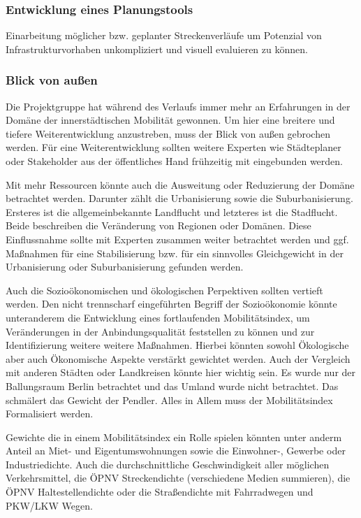 \subsubsection{Entwicklung eines Planungstools}
Einarbeitung möglicher bzw. geplanter Streckenverläufe um Potenzial von Infrastrukturvorhaben unkompliziert und visuell evaluieren zu können.

\subsubsection{Blick von außen}
Die Projektgruppe hat während des Verlaufs immer mehr an Erfahrungen in der Domäne der innerstädtischen Mobilität gewonnen. Um hier eine breitere und tiefere Weiterentwicklung anzustreben, muss der Blick von außen gebrochen werden.
Für eine Weiterentwicklung sollten weitere Experten wie Städteplaner oder Stakeholder aus der öffentliches Hand frühzeitig mit eingebunden werden.

Mit mehr Ressourcen könnte auch die Ausweitung oder Reduzierung der Domäne betrachtet werden. Darunter zählt die Urbanisierung sowie die Suburbanisierung.
Ersteres ist die allgemeinbekannte Landflucht und letzteres ist die Stadflucht. Beide beschreiben die Veränderung von Regionen oder Domänen. 
Diese Einflussnahme sollte mit Experten zusammen weiter betrachtet werden und ggf. Maßnahmen für eine Stabilisierung bzw. für ein sinnvolles Gleichgewicht in der Urbanisierung oder Suburbanisierung gefunden werden.

Auch die Sozioökonomischen und ökologischen Perpektiven sollten vertieft werden. 
Den nicht trennscharf eingeführten Begriff der Sozioökonomie könnte unteranderem die Entwicklung eines fortlaufenden Mobilitätsindex, um Veränderungen in der Anbindungsqualität feststellen zu können und zur Identifizierung weitere weitere Maßnahmen.
Hierbei könnten sowohl Ökologische aber auch Ökonomische Aspekte verstärkt gewichtet werden. %
Auch der Vergleich mit anderen Städten oder Landkreisen könnte hier wichtig sein. Es wurde nur der Ballungsraum Berlin betrachtet und das Umland wurde nicht betrachtet. Das schmälert das Gewicht der Pendler. Alles in Allem muss der Mobilitätsindex Formalisiert werden. 

Gewichte die in einem Mobilitätsindex ein Rolle spielen könnten unter anderm Anteil an Miet- und Eigentumswohnungen sowie die Einwohner-, 
Gewerbe oder Industriedichte. Auch die durchschnittliche Geschwindigkeit aller möglichen Verkehrsmittel, 
die ÖPNV Streckendichte (verschiedene Medien summieren), die ÖPNV Haltestellendichte oder die Straßendichte mit Fahrradwegen und PKW/LKW Wegen.

